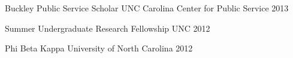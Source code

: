 \begin{cvhonors}
  \cvhonor
    {Buckley Public Service Scholar} %
    {UNC Carolina Center for Public Service} %
    { } %
    {2013} %
    
  \cvhonor
    {Summer Undergraduate Research Fellowship} %
    {UNC} %
    { } %
    {2012} %
    
  \cvhonor
    {Phi Beta Kappa} %
    {University of North Carolina} %
    { } %
    {2012} %
\end{cvhonors}

